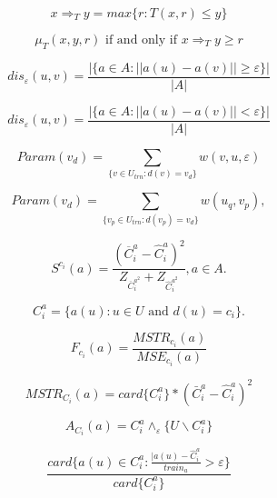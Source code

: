 ﻿\documentclass[a4paper,12pt]{article}
\begin{document}
\begin{displaymath}
	x\Rightarrow_Ty = max \{ r:T(x,r)\leq{}y \}
\end{displaymath}

\begin{displaymath}
	\mu_T(x,y,r) \textrm{ if and only if } x\Rightarrow_T y \geq r
\end{displaymath}

\begin{displaymath}
	dis_\varepsilon (u,v) = \frac{ | \{ a\in A: ||a(u) - a(v) || 
	\geq \varepsilon \} | }
	{ |A| }
\end{displaymath}

\begin{displaymath}
	dis_\varepsilon (u,v) = \frac{ | \{ a\in A: ||a(u) - a(v) || 
	< \varepsilon \} | }
	{ |A| }
\end{displaymath}

\begin{displaymath}
	Param(v_d) = \sum_{ \{ v\in U_{trn}:d(v)=v_d  \} } w(v,u,\varepsilon)
\end{displaymath}

\begin{displaymath}
	Param(v_d) = \sum_{ \{ v_p\in U_{trn}:d(v_p)=v_d  \} } w(u_q, v_p),
\end{displaymath}

\begin{displaymath}
	S^{c_i}(a)=\frac{ (\overline{C}^a_i - \hat{C}^a_i )^2 }
	{ Z_{{\overline{C}^{a^2}_i} } + Z_{\hat{C}^{a^2}_i } }, a\in A.
\end{displaymath}

\begin{displaymath}
	C^a_i= \{ a(u):u\in U \textrm{ and } d(u)=c_i\}.
\end{displaymath}

\begin{displaymath}
	F_{c_i}(a)= \frac{MSTR_{c_i}(a)}{MSE_{c_i}(a)}
\end{displaymath}

\begin{displaymath}
	MSTR_{C_i}(a) = card\{ C^a_i \} \ast ( \bar{C}^a_i - \hat{C}^a_i )^2
\end{displaymath}

\begin{displaymath}
	A_{C_i}(a) = C^a_i \wedge_\varepsilon \{U\backslash C^a_i\}
\end{displaymath}

\begin{displaymath}
	\frac{card\{ a(u) \in C^a_i: \frac{|a(u)-\hat{C}^a_i}{train_a}>
		\varepsilon  \}}
	{card\{ C^a_i \}}
\end{displaymath}
\end{document}
